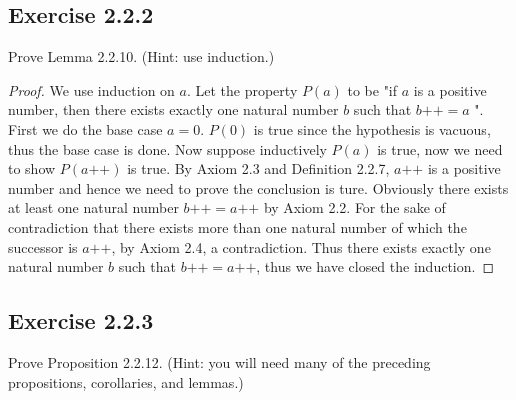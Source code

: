 \documentclass[a4paper]{article}
\begin{document}
\subsection*{Exercise 2.2.2}

Prove Lemma 2.2.10. (Hint: use induction.)

\begin{proof}

We use induction on $a$. Let the property  $P(a)$ to be "if $a$ is a positive number, then there exists exactly one natural number $b$ such that $b\text{++} = a$ ". First we do the base case $a = 0$. $P(0)$ is true since the hypothesis is vacuous, thus the base case is done. Now suppose inductively $P(a)$ is true, now we need to show  $P(a\text{++})$ is true. By Axiom 2.3 and Definition 2.2.7, $a\text{++}$ is a positive number and hence we need to prove the conclusion is ture. Obviously there exists at least one natural number $b\text{++} = a\text{++}$ by Axiom 2.2. For the sake of contradiction that there exists more than one natural number of which the successor is $a\text{++}$, by Axiom 2.4, a contradiction. Thus there exists exactly one natural number $b$ such that $b\text{++} = a\text{++}$, thus we have closed the induction.

\end{proof}

\subsection*{Exercise 2.2.3}

Prove Proposition 2.2.12. (Hint: you will need many of the
preceding propositions, corollaries, and lemmas.)
\end{document}
